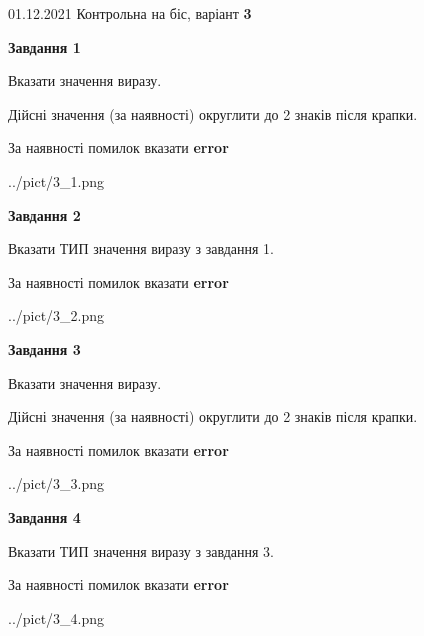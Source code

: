 \documentclass[11pt, ukrainian]{article}
\begin{document}
{01.12.2021 Контрольна на біс, варіант  \No \textbf { 3 }\par}
{
\begin {large}
{\begin {center}\textbf{Завдання 1}\end {center}}\par
Вказати значення виразу. \par
Дійсні значення (за наявності) округлити до 2 знаків після крапки. \par
За наявності помилок вказати \textbf{error}

\begin{center}
	{../pict/3_1.png}
\end{center}
\newpage

{\begin {center}\textbf{Завдання 2}\end {center}}\par
Вказати ТИП значення виразу з завдання 1. \par
За наявності помилок вказати \textbf{error}

\begin{center}
	{../pict/3_2.png}
\end{center}
\newpage

{\begin {center}\textbf{Завдання 3}\end {center}}\par
Вказати значення виразу. \par
Дійсні значення (за наявності) округлити до 2 знаків після крапки. \par
За наявності помилок вказати \textbf{error}

\begin{center}
	{../pict/3_3.png}
\end{center}
\newpage

{\begin {center}\textbf{Завдання 4}\end {center}}\par
Вказати ТИП значення виразу з завдання 3. \par
За наявності помилок вказати \textbf{error}

\begin{center}
	{../pict/3_4.png}
\end{center}
\newpage


\end{large}}
\end{document}
